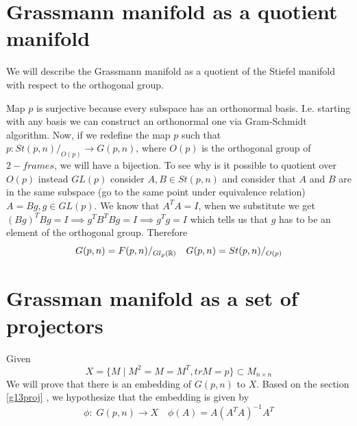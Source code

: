 \documentclass[11pt,a4paper]{report}
\begin{document}
\section{Grassmann manifold as a quotient manifold } \label{grassquot}
We will describe the Grassmann manifold as a quotient of the Stiefel manifold with respect to the orthogonal group.
\begin{center}
\end{center}
Map $p$ is surjective because every subspace has an orthonormal basis.
I.e. starting with any basis we can construct an orthonormal one via Gram-Schmidt algorithm.
Now, if we redefine the map $p$ such that $p: { St(p,n) / _{O(p)}} \to G(p,n)$, where $O(p)$
is the orthogonal group of $2-frames$, we will have a bijection. 
To see why is it possible to quotient over $O(p)$ instead $GL(p)$ consider $A,B \in St(p,n)$ and consider that $A$ and $B$ are in the same subspace (go to the same point under equivalence relation) $A = B g, g \in GL(p)$.
We know that $ A^T A = I $, when we substitute we get $ (Bg)^T Bg = I \implies g^T B^T B g = I \implies g^T g = I$ which tells us that $g$ has to be an element of the orthogonal group.
Therefore 
$$ G(p,n) = F(p,n) / _{Gl_p(\mathbb{R})} \quad G(p,n) = St(p,n) / _{O(p) }$$
\section{Grassman manifold as a set of projectors }
Given
$$ X = \{ M \; | \; M^2 = M = M^T, trM=p \} \subset M_{n \times n} $$
We will prove that there is an embedding of $G(p,n)$ to $X$.
Based on the section \ref{g13proj} , we hypothesize that the embedding is given by
$$ \phi: \; G(p,n) \to X \quad \phi(A) = A(A^T A)^{-1} A^T  $$
\end{document}
